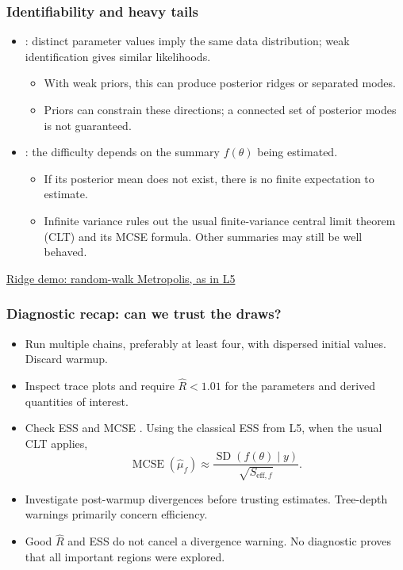 \documentclass[10pt]{beamer}
\begin{document}
\begin{frame}
\frametitle{Identifiability and heavy tails}

  \begin{itemize}
  \item {}: distinct parameter values imply the
    same data distribution; weak identification gives similar likelihoods.
    \begin{itemize}
    \item With weak priors, this can produce posterior ridges or separated modes.
    \item Priors can constrain these directions; a connected set of
      posterior modes is not guaranteed.
    \end{itemize}
  \pause
  \item {}: the difficulty depends on the summary
    $f(\theta)$ being estimated.
    \begin{itemize}
    \item If its posterior mean does not exist, there is no finite
      expectation to estimate.
    \item Infinite variance rules out the usual finite-variance central
      limit theorem (CLT) and its MCSE formula.
      Other summaries may still be well behaved.
    \end{itemize}
  \end{itemize}

  \vfill
  \href{https://chi-feng.github.io/mcmc-demo/app.html?algorithm=RandomWalkMH&target=donut}{Ridge demo: random-walk Metropolis, as in L5}
\end{frame}

\begin{frame}
\frametitle{Diagnostic recap: can we trust the draws?}

\begin{itemize}
\item Run multiple chains, preferably at least four, with dispersed
  initial values. Discard warmup.
\item Inspect trace plots and require $\widehat R<1.01$ for the
  parameters and derived quantities of interest.
\pause
\item Check ESS and MCSE .
  Using the classical ESS from L5, when the usual CLT applies,
  \[
  \operatorname{MCSE}(\widehat\mu_f)
  \approx \frac{\operatorname{SD}(f(\theta)\mid y)}{\sqrt{S_{\mathrm{eff},f}}}.
  \]
\item Investigate post-warmup divergences before trusting estimates.
  Tree-depth warnings primarily concern efficiency.
\pause
\item Good $\widehat R$ and ESS do not cancel a divergence warning.
  No diagnostic proves that all important regions were explored.
\end{itemize}
\end{frame}
\end{document}

